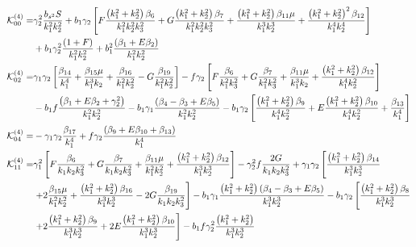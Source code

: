 \begin{align*}
\ko_{00}^{(4)}=& \gamma_2^2 \frac{b_{s^2} S}{k_1^2 k_2^2} + b_1 \gamma_2 \left[ F \frac{\left(k_1^2 + k_2^2 \right) \beta_{6}}{k_1^2 k_2^2 k_3^2} + G \frac{\left( k_1^2 + k_2^2 \right) \beta_{7}}{k_1^2 k_2^2 k_3^2} + \frac{\left( k_1^2 + k_2^2\right) \beta_{11} \mu }{k_1^3 k_2^3} + \frac{\left(k_1^2 + k_2^2 \right)^2 \beta_{12}}{k_1^4 k_2^4} \right] \\
&+ b_1 \gamma_2^2 \frac{\left( 1 + F \right)}{k_1^2 k_2^2} + b_1^2 \frac{\left( \beta_1 + E \beta_2 \right)}{k_1^2 k_2^2}\\
\ko_{02}^{(4)}=& \gamma_1 \gamma_2 \left[ \frac{\beta_{14}}{k_1^4} + \frac{\beta_{15} \mu}{k_1^3 k_2} + \frac{\beta_{16}}{k_1^2 k_2^2} - G \frac{\beta_{19}}{k_1^2 k_2^2} \right] - f \gamma_2 \left[ F \frac{\beta_{6}}{k_1^2 k_3^2} + G \frac{\beta_{7}}{k_1^2 k_3^2} + \frac{\beta_{11} \mu }{k_1^3 k_2} + \frac{ \left( k_1^2 + k_2^2 \right) \beta_{12}}{k_1^4 k_2^2} \right] \\
&- b_1 f \frac{\left( \beta_1 + E \beta_2 + \gamma_2^2 \right)}{k_1^2 k_2^2} - b_1 \gamma_1 \frac{\left( {\beta_{4}-\beta_{3}} + E \beta_{5} \right)}{k_1^2 k_2^2} - b_1 \gamma_2 \left[ \frac{\left( k_1^2 + k_2^2 \right) \beta_{9}}{k_1^4 k_2^2} + E \frac{\left( k_1^2 + k_2^2\right) \beta_{10} }{k_1^4 k_2^2} + \frac{\beta_{13}}{k_1^4} \right] \\
\ko_{04}^{(4)}=& - \gamma_1 \gamma_2 \frac{\beta_{17}}{k_1^4} + f \gamma_2 \frac{\left( \beta_{9} + E \beta_{10} + \beta_{13} \right)}{k_1^4}\\
\ko_{11}^{(4)}=& \gamma_1^2 \left[ F \frac{\beta_{6}}{k_1 k_2 k_3^2} + G \frac{\beta_{7}}{k_1 k_2 k_3^2} + \frac{\beta_{11} \mu}{k_1^2 k_2^2} + \frac{\left( k_1^2 + k_2^2\right) \beta_{12}}{k_1^3 k_2^3} \right] - \gamma_2^2 f \frac{2 G}{k_1 k_2 k_3^2} + \gamma_1 \gamma_2 \left[ \frac{\left( k_1^2 + k_2^2 \right) \beta_{14}}{k_1^3 k_2^3} \right. \\
&\left. + 2 \frac{\beta_{15} \mu}{k_1^2 k_2^2} + \frac{\left( k_1^2 + k_2^2 \right) \beta_{16}}{k_1^3 k_2^3} - 2 G \frac{\beta_{19}}{k_1 k_2 k_3^2} \right] - b_1 \gamma_1 \frac{\left( k_1^2 + k_2^2\right) \left( {\beta_{4}-\beta_{3}} + E \beta_{5} \right)}{k_1^3 k_2^3} - b_1 \gamma_2 \left[ \frac{\left( k_1^2 + k_2^2 \right) \beta_{8}}{k_1^3 k_2^3} \right. \\
&\left. + 2 \frac{\left( k_1^2 + k_2^2 \right) \beta_{9}}{k_1^3 k_2^3} + 2 E \frac{\left(k_1^2 + k_2^2 \right) \beta_{10}}{k_1^3 k_2^3} \right] - b_1 f \gamma_2^2 \frac{\left( k_1^2 + k_2^2 \right)}{k_1^3 k_2^3 } \\

\end{align*}
